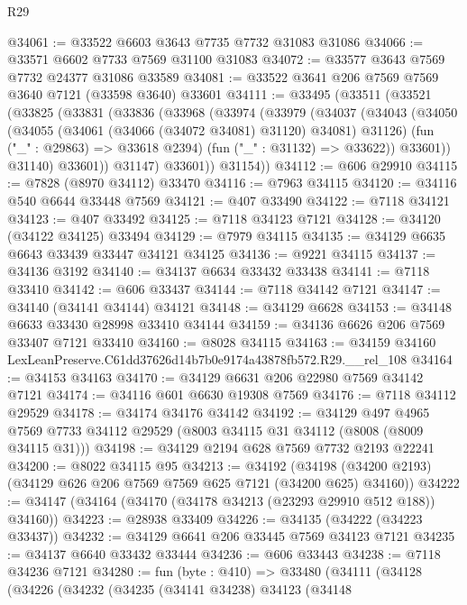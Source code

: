 \begin{lexlean}{R29}
\begin{coremodule}
@34061 := @33522 @6603 @3643 @7735 @7732 @31083 @31086
@34066 := @33571 @6602 @7733 @7569 @31100 @31083
@34072 := @33577 @3643 @7569 @7732 @24377 @31086 @33589
@34081 := @33522 @3641 @206 @7569 @7569 @3640 @7121 (@33598 @3640) @33601
@34111 := @33495
    (@33511
      (@33521
        (@33825
          (@33831
            (@33836
              (@33968
                (@33974
                  (@33979
                    (@34037
                      (@34043
                        (@34050
                          (@34055 (@34061 (@34066 (@34072 @34081) @31120) @34081) @31126)
                          (fun ("_" : @29863) => @33618 @2394)
                          (fun ("_" : @31132) => @33622))
                        @33601))
                    @31140)
                  @33601))
              @31147)
            @33601))
        @31154))
@34112 := @606 @29910
@34115 := @7828 (@8970 @34112) @33470
@34116 := @7963 @34115
@34120 := @34116 @540 @6644 @33448 @7569
@34121 := @407 @33490
@34122 := @7118 @34121
@34123 := @407 @33492
@34125 := @7118 @34123 @7121
@34128 := @34120 (@34122 @34125) @33494
@34129 := @7979 @34115
@34135 := @34129 @6635 @6643 @33439 @33447 @34121 @34125
@34136 := @9221 @34115
@34137 := @34136 @3192
@34140 := @34137 @6634 @33432 @33438
@34141 := @7118 @33410
@34142 := @606 @33437
@34144 := @7118 @34142 @7121
@34147 := @34140 (@34141 @34144) @34121
@34148 := @34129 @6628
@34153 := @34148 @6633 @33430 @28998 @33410 @34144
@34159 := @34136 @6626 @206 @7569 @33407 @7121 @33410
@34160 := @8028 @34115
@34163 := @34159 @34160 LexLeanPreserve.C61dd37626d14b7b0e9174a43878fb572.R29.__rel_108
@34164 := @34153 @34163
@34170 := @34129 @6631 @206 @22980 @7569 @34142 @7121
@34174 := @34116 @601 @6630 @19308 @7569
@34176 := @7118 @34112 @29529
@34178 := @34174 @34176 @34142
@34192 := @34129
    @497
    @4965
    @7569
    @7733
    @34112
    @29529
    (@8003 @34115 @31 @34112 (@8008 (@8009 @34115 @31)))
@34198 := @34129 @2194 @628 @7569 @7732 @2193 @22241
@34200 := @8022 @34115 @95
@34213 := @34192
    (@34198 (@34200 @2193) (@34129 @626 @206 @7569 @7569 @625 @7121 (@34200 @625) @34160))
@34222 := @34147 (@34164 (@34170 (@34178 @34213 (@23293 @29910 @512 @188)) @34160))
@34223 := @28938 @33409
@34226 := @34135 (@34222 (@34223 @33437))
@34232 := @34129 @6641 @206 @33445 @7569 @34123 @7121
@34235 := @34137 @6640 @33432 @33444
@34236 := @606 @33443
@34238 := @7118 @34236 @7121
@34280 := fun (byte : @410) =>
  @33480
    (@34111
      (@34128
        (@34226
          (@34232
            (@34235
              (@34141 @34238)
              @34123
              (@34148

\end{coremodule}
\end{lexlean}
